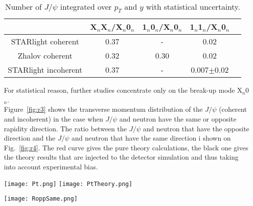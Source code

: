     \begin{table}[h]
    \begin{center}
     \caption{Number of  $J/\psi$ integrated over $p_{T}$ and $y$ with statistical uncertainty.}
    \label{tab:r3}
    \begin{tabular}{|c|c|c|c|c|}
    \hline
                                     & X$_{n}$X$_{n}$/X$_{n}$0$_{n}$ & 1$_{n}$0$_{n}$/X$_{n}$0$_{n}$ & 1$_{n}$1$_{n}$/X$_{n}$0$_{n}$  \\ 
    \hline
    STARlight coherent &  0.37&-&0.02\\
    \hline
    Zhalov coherent& 0.32&0.30&0.02\\
    \hline
    STARlight incoherent &  0.37&-&0.007$\pm$0.02 \\
    \hline
    \end{tabular}
    \end{center}
    
    \end{table}
    
    For statistical reason, further studies concentrate only on the break-up mode 
      X$_{n}$0$_{n}$. \\
    Figure~\ref{fig:r3} shows the transverse momentum distribution of the $J/\psi$ 
      (coherent and incoherent) in the case when $J/\psi$ and neutron have the same
      or opposite rapidity direction. 
    The ratio between the $J/\psi$ and neutron that have the opposite direction and
      the $J/\psi$ and neutron that have the same direction i shown on 
      Fig.~\ref{fig:r4}. 
    The red curve gives the pure theory calculations, the black one gives the theory 
      results that are injected to the detector simulation and thus taking into 
      account experimental bias. 
     
    \begin{figure*}[!Hhtb]
      \begin{center}
        \texttt{[image: Pt.png]}
            \texttt{[image: PtTheory.png]}
    
    
                 \caption{
        \label{fig:r3}  
         Transverse momentum distribution of the $J/\psi$ when $J/\psi$ and neutron have the same or opposite rapidity direction from data (left) and from theory (right). 
            }
           \end{center}
    \end{figure*}
    
    \begin{figure*}[!Hhtb]
      \begin{center}
        \texttt{[image: RoppSame.png]}\\
    
                 \caption{
        \label{fig:r4}  
         Ratio between the transverse momentum distribution of the $J/\psi$ when  $J/\psi$ and neutron have the opposite direction and the transverse momentum distribution of the $J/\psi$ when  $J/\psi$ and neutron have the same direction. 
            }
           \end{center}
    \end{figure*}
    

